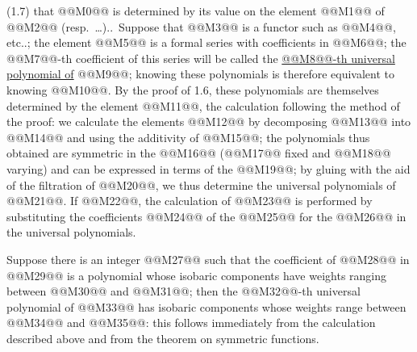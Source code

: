 (1.7) that @@M0@@ is determined by its value on the element @@M1@@ of @@M2@@ (resp.\ \ldots)..\ Suppose that @@M3@@ is a functor such as @@M4@@, etc..; the element @@M5@@ is a formal series with coefficients in @@M6@@; the @@M7@@-th coefficient of this series will be called the \uline{@@M8@@-th universal polynomial of} @@M9@@; knowing these polynomials is therefore equivalent to knowing @@M10@@. By the proof of 1.6, these polynomials are themselves determined by the element @@M11@@, the calculation following the method of the proof: we calculate the elements @@M12@@ by decomposing @@M13@@ into @@M14@@ and using the additivity of @@M15@@; the polynomials thus obtained are symmetric in the @@M16@@ (@@M17@@ fixed and @@M18@@ varying) and can be expressed in terms of the @@M19@@; by gluing with the aid of the filtration of @@M20@@, we thus determine the universal polynomials of @@M21@@. If @@M22@@, the calculation of @@M23@@ is performed by substituting the coefficients @@M24@@ of the @@M25@@ for the @@M26@@ in the universal polynomials.

Suppose there is an integer @@M27@@ such that the coefficient of @@M28@@ in @@M29@@ is a polynomial whose isobaric components have weights ranging between @@M30@@ and @@M31@@; then the @@M32@@-th universal polynomial of @@M33@@ has isobaric components whose weights range between @@M34@@ and @@M35@@: this follows immediately from the calculation described above and from the theorem on symmetric functions.

